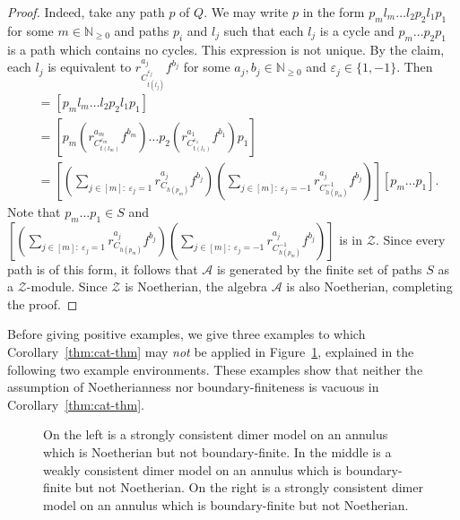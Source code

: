 \documentclass{article}
\theoremstyle{definition}
\begin{document}
\begin{proof}
	Indeed, take any path $p$ of $Q$. 
	{We may write $p$ in the form $p_m l_m \dots l_2p_2l_1p_1$ for some $m\in\mathbb N_{\geq0}$ and paths $p_i$ and $l_j$ such that each $l_j$ is a cycle and $p_m\dots p_2p_1$ is a path which contains no cycles. This expression is not unique.}
	By the claim, each $l_j$ is equivalent to $r_{C_{t(l_j)}^{\varepsilon_j}}^{a_j}f^{b_j}$ for some $a_j,b_j\in\mathbb N_{\geq0}$ and $\varepsilon_j\in\{1,-1\}$.
	Then
	\begin{align*}
		[p]&=[p_ml_m\dots l_2p_2l_1p_1] \\
		&=\left[p_m\left(
		r_{C_{t(l_m)}^{\varepsilon_m}}^{a_m}f^{b_m}\right)\dots p_2
		\left(r_{C_{t(l_1)}^{\varepsilon_1}}^{a_1}f^{b_1}\right)p_1\right]\\
		&=\left[
			\left(\sum_{j\in[m] :\ \varepsilon_j=1}r_{C_{h(p_m)}}^{a_j}f^{b_j}\right)
			\left(\sum_{j\in[m] :\ \varepsilon_j=-1}r_{C_{h(p_m)}^{-1}}^{a_j}f^{b_j}\right)\right][p_m\dots p_1].
	\end{align*}
	Note that $p_m\dots p_1\in S$ and 
$\left[ \left(\sum_{j\in[m] :\ \varepsilon_j=1}r_{C_{h(p_m)}}^{a_j}f^{b_j}\right) \left(\sum_{j\in[m] :\ \varepsilon_j=-1}r_{C_{h(p_m)}^{-1}}^{a_j}f^{b_j}\right)\right]$ is in $\mathcal Z$. Since every path is of this form, it follows that $\mathcal A$ is generated by the finite set of paths $S$ as a $\mathcal Z$-module. Since $\mathcal Z$ is Noetherian, the algebra $\mathcal A$ is also Noetherian, completing the proof.
\end{proof}

Before giving positive examples, we give three examples to which Corollary~\ref{thm:cat-thm} may \textit{not} be applied in Figure~\ref{fig:noeth-ann}, explained in the following two example environments. These examples show that neither the assumption of Noetherianness nor boundary-finiteness is vacuous in Corollary~\ref{thm:cat-thm}.

\def\svgwidth{410pt}
\begin{figure}
	\centering
	
	\caption{On the left is a strongly consistent dimer model on an annulus which is Noetherian but not boundary-finite. In the middle is a weakly consistent dimer model on an annulus which is boundary-finite but not Noetherian. On the right is a strongly consistent dimer model on an annulus which is boundary-finite but not Noetherian.}
	\label{fig:noeth-ann}
\end{figure}
\end{document}
